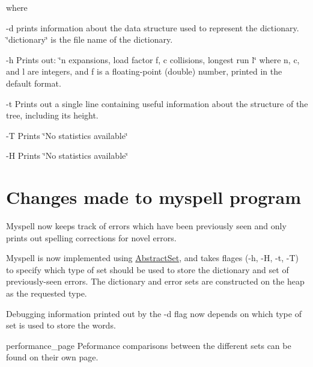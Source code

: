 where
\begin{DoxyItemize}
\item -\/d prints information about the data structure used to represent the dictionary. \char`\"{}dictionary\char`\"{} is the file name of the dictionary.
\item -\/h Prints out\-: \char`\"{}n expansions, load factor f, c collisions, longest run l\char`\"{} where n, c, and l are integers, and f is a floating-\/point (double) number, printed in the default format.
\item -\/t Prints out a single line containing useful information about the structure of the tree, including its height.
\item -\/\-T Prints \char`\"{}\-No statistics available\char`\"{}
\item -\/\-H Prints \char`\"{}\-No statistics available\char`\"{}
\end{DoxyItemize}\hypertarget{index_change_sec}{}\section{Changes made to myspell program}\label{index_change_sec}
Myspell now keeps track of errors which have been previously seen and only prints out spelling corrections for novel errors.

Myspell is now implemented using \hyperlink{class_abstract_set}{Abstract\-Set}, and takes flages (-\/h, -\/\-H, -\/t, -\/\-T) to specify which type of set should be used to store the dictionary and set of previously-\/seen errors. The dictionary and error sets are constructed on the heap as the requested type.

Debugging information printed out by the -\/d flag now depends on which type of set is used to store the words.

performance\-\_\-page Peformance comparisons between the different sets can be found on their own page. 